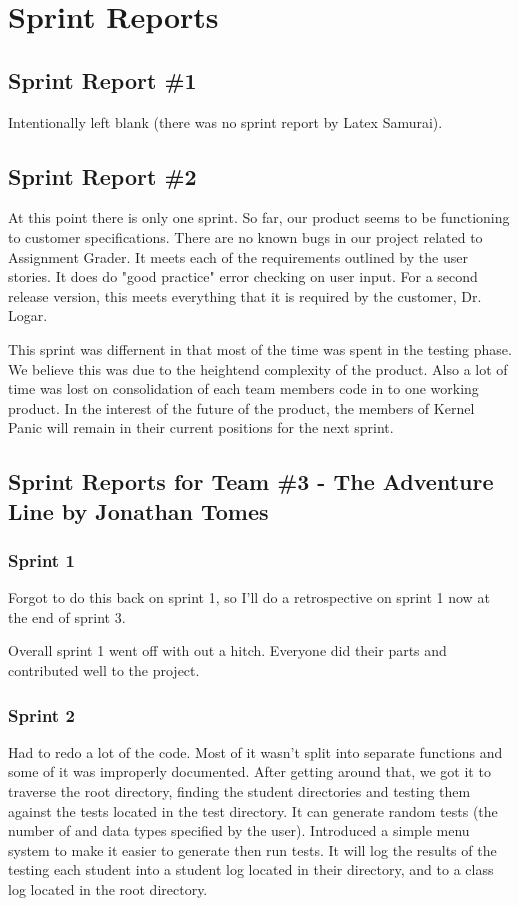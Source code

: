 
\chapter{Sprint Reports}

\section{Sprint Report \#1}
Intentionally left blank (there was no sprint report by Latex Samurai).


\section{Sprint Report \#2}

At this point there is only one sprint. So far, our product seems to be functioning to customer specifications. There are no known bugs
in our project related to Assignment Grader.
It meets
each of the requirements outlined by the user stories. It does do "good practice" error checking on user input.
For a second release version, this meets everything that it is required by the customer, Dr. Logar. 
\par{} This sprint
was differnent in that most of the time was spent in the testing phase. We believe this was due to the heightend complexity of the product. Also a lot of time was lost on consolidation of each team members code in to one working product.
In the interest of the future of the product, the members of Kernel Panic will remain in their current
positions for the next sprint.

\section{Sprint Reports for Team \#3 - The Adventure Line by Jonathan Tomes}
\subsection{Sprint 1}
Forgot to do this back on sprint 1, so I'll do a retrospective on sprint 1 now at the end of sprint 3.

Overall sprint 1 went off with out a hitch. Everyone did their parts and contributed well to the project.

\subsection{Sprint 2}
Had to redo a lot of the code. Most of it wasn't split into separate functions and some of it was
improperly documented. After getting around that, we got it to traverse the root directory, finding the
student directories and testing them against the tests located in the test directory. It can generate random
tests (the number of and data types specified by the user). Introduced a simple menu system to make it easier
to generate then run tests. It will log the results of the testing each student into a student log located in their
directory, and to a class log located in the root directory.

